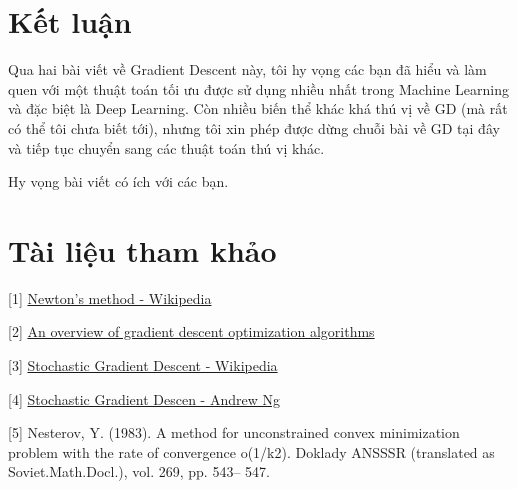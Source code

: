  
 
\section{Kết luận}
Qua hai bài viết về Gradient Descent này, tôi hy vọng các bạn đã hiểu và làm quen với một thuật toán tối ưu được sử dụng nhiều nhất trong Machine Learning và đặc biệt là Deep Learning. Còn nhiều biến thể khác khá thú vị về GD (mà rất có thể tôi chưa biết tới), nhưng tôi xin phép được dừng chuỗi bài về GD tại đây và tiếp tục chuyển sang các thuật toán thú vị khác.  
 
Hy vọng bài viết có ích với các bạn. 
 
 
\section{Tài liệu tham khảo}
 
[1] \href{https://en.wikipedia.org/wiki/Newton's_method}{Newton's method - Wikipedia} 
 
[2] \href{http://sebastianruder.com/optimizing-gradient-descent/index.html#stochasticgradientdescent}{An overview of gradient descent optimization algorithms} 
 
[3] \href{https://en.wikipedia.org/wiki/Stochastic_gradient_descent}{Stochastic Gradient Descent - Wikipedia} 
 
[4] \href{https://www.youtube.com/watch?v=UfNU3Vhv5CA}{Stochastic Gradient Descen - Andrew Ng}  
 
[5] Nesterov, Y. (1983). A method for unconstrained convex minimization problem with the rate of convergence o(1/k2). Doklady ANSSSR (translated as Soviet.Math.Docl.), vol. 269, pp. 543– 547. 

